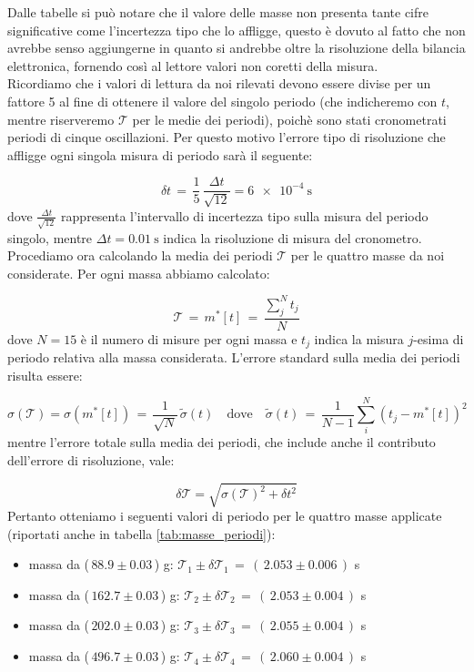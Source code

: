 Dalle tabelle si può notare che il valore delle masse non presenta tante cifre significative come l'incertezza tipo che lo affligge,
questo è dovuto al fatto che non avrebbe senso aggiungerne in quanto si andrebbe oltre la risoluzione della bilancia elettronica,
fornendo così al lettore valori non coretti della misura.\\

Ricordiamo che i valori di lettura da noi rilevati devono essere divise per un fattore 5 al fine di ottenere il valore del singolo periodo
(che indicheremo con $t$, mentre riserveremo $\mathcal{T}$ per le medie dei periodi), poichè sono stati  cronometrati periodi di cinque oscillazioni. Per questo motivo l'errore tipo di risoluzione che affligge ogni singola misura di periodo sarà il seguente:

\begin{equation*}
	\delta t \,=\, \frac{1}{5} \, \frac{\Delta t}{\sqrt{12}} = \SI{6e-4}{\second}
\end{equation*}
%
dove $\frac{\Delta t}{\sqrt{12}}$ rappresenta l'intervallo di incertezza tipo sulla misura del periodo singolo, mentre
$\Delta t = \SI{0.01}{\second}$ indica la risoluzione di misura del cronometro.\\
Procediamo ora calcolando la media dei periodi $\mathcal{T}$ per le quattro masse da noi considerate. Per ogni massa
abbiamo calcolato:

\begin{equation*}
	\mathcal{T} \,=\, m^*[t] \,=\, \frac{\sum_{j}^{N} t_j}{N}
\end{equation*}
%
dove $N = 15$ è il numero di misure per ogni massa e $t_j$ indica la misura $j$-esima di periodo
relativa alla massa considerata. L'errore standard sulla media dei periodi risulta essere:

\begin{equation*}
    \sigma (\mathcal{T}) = \sigma(m^*[t]) \,=\, \frac{1}{\sqrt{N}} \, \tilde\sigma (t) \quad \text{dove} \quad \tilde\sigma(t)
    \,=\, \frac{1}{N-1} \sum_{i}^{N} (t_j - m^*[t])^2
\end{equation*}
%
mentre l'errore totale sulla media dei periodi, che include anche il contributo dell'errore di risoluzione, vale:

\begin{equation*}
    \delta \mathcal{T} = \sqrt{\sigma (\mathcal{T})^2 + \delta t^2}
\end{equation*}
%
Pertanto otteniamo i seguenti valori di periodo per le quattro masse applicate (riportati anche in tabella \ref{tab:masse_periodi}):
\begin{itemize}
	\item{ massa da ($\,88.9 \pm 0.03\,$) g: $\mathcal{T}_1 \pm \delta\mathcal{T}_1 \,=\, (\,2.053  \pm 0.006\,)$ s}
	\item{ massa da ($\,162.7 \pm 0.03\,$) g: $\mathcal{T}_2 \pm \delta\mathcal{T}_2 \,=\, (\,2.053 \pm 0.004\,)$ s}
	\item{ massa da ($\,202.0 \pm 0.03\,$) g: $\mathcal{T}_3 \pm \delta\mathcal{T}_3 \,=\, (\,2.055 \pm 0.004\,)$ s}
	\item{ massa da ($\,496.7 \pm 0.03\,$) g: $\mathcal{T}_4 \pm \delta\mathcal{T}_4 \,=\, (\,2.060 \pm 0.004\,)$ s}
\end{itemize}

